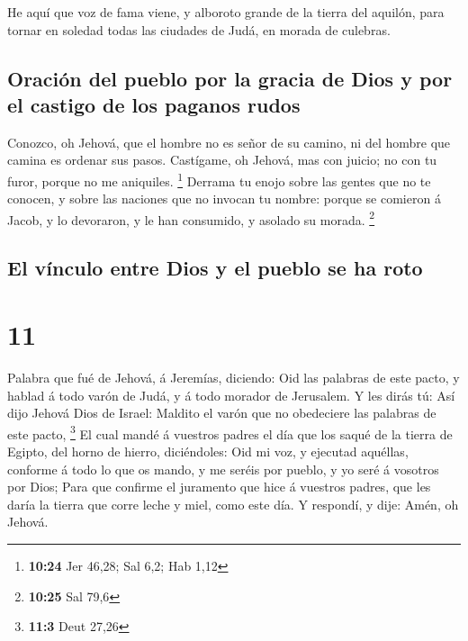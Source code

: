  He aquí que voz de fama viene, y alboroto grande de la
tierra del aquilón, para tornar en soledad todas las ciudades de Judá,
en morada de culebras.

\hypertarget{oraciuxf3n-del-pueblo-por-la-gracia-de-dios-y-por-el-castigo-de-los-paganos-rudos}{%
\subsection{Oración del pueblo por la gracia de Dios y por el castigo de
los paganos
rudos}\label{oraciuxf3n-del-pueblo-por-la-gracia-de-dios-y-por-el-castigo-de-los-paganos-rudos}}

 Conozco, oh Jehová, que el hombre no es señor de su
camino, ni del hombre que camina es ordenar sus pasos. 
Castígame, oh Jehová, mas con juicio; no con tu furor, porque no me
aniquiles. \footnote{\textbf{10:24} Jer 46,28; Sal 6,2; Hab 1,12}
 Derrama tu enojo sobre las gentes que no te conocen, y
sobre las naciones que no invocan tu nombre: porque se comieron á Jacob,
y lo devoraron, y le han consumido, y asolado su morada. \footnote{\textbf{10:25}
  Sal 79,6}

\hypertarget{el-vuxednculo-entre-dios-y-el-pueblo-se-ha-roto}{%
\subsection{El vínculo entre Dios y el pueblo se ha
roto}\label{el-vuxednculo-entre-dios-y-el-pueblo-se-ha-roto}}

\hypertarget{section-10}{%
\section{11}\label{section-10}}

 Palabra que fué de Jehová, á Jeremías, diciendo:
 Oid las palabras de este pacto, y hablad á todo varón de
Judá, y á todo morador de Jerusalem.  Y les dirás tú: Así
dijo Jehová Dios de Israel: Maldito el varón que no obedeciere las
palabras de este pacto, \footnote{\textbf{11:3} Deut 27,26} 
El cual mandé á vuestros padres el día que los saqué de la tierra de
Egipto, del horno de hierro, diciéndoles: Oid mi voz, y ejecutad
aquéllas, conforme á todo lo que os mando, y me seréis por pueblo, y yo
seré á vosotros por Dios;  Para que confirme el juramento
que hice á vuestros padres, que les daría la tierra que corre leche y
miel, como este día. Y respondí, y dije: Amén, oh Jehová.

